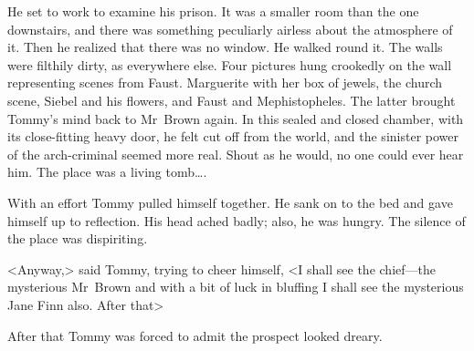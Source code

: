 He set to work to examine his prison. It was a smaller room than the one downstairs, and there was something peculiarly airless about the atmosphere of it. Then he realized that there was no window. He walked round it. The walls were filthily dirty, as everywhere else. Four pictures hung crookedly on the wall representing scenes from Faust. Marguerite with her box of jewels, the church scene, Siebel and his flowers, and Faust and Mephistopheles. The latter brought Tommy's mind back to Mr~Brown again. In this sealed and closed chamber, with its close-fitting heavy door, he felt cut off from the world, and the sinister power of the arch-criminal seemed more real. Shout as he would, no one could ever hear him. The place was a living tomb\dots.

With an effort Tommy pulled himself together. He sank on to the bed and gave himself up to reflection. His head ached badly; also, he was hungry. The silence of the place was dispiriting.

<Anyway,> said Tommy, trying to cheer himself, <I shall see the chief—the mysterious Mr~Brown and with a bit of luck in bluffing I shall see the mysterious Jane Finn also. After that\longdash>

After that Tommy was forced to admit the prospect looked dreary. 